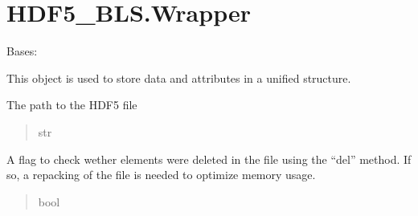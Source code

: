 \documentclass[letterpaper,10pt,english]{sphinxmanual}
\begin{document}
\sphinxstepscope


\section{HDF5\_BLS.Wrapper}
\label{\detokenize{source/_autosummary/HDF5_BLS.Wrapper:hdf5-bls-wrapper}}\label{\detokenize{source/_autosummary/HDF5_BLS.Wrapper::doc}}

\begin{fulllineitems}
\label{\detokenize{source/_autosummary/HDF5_BLS.Wrapper:HDF5_BLS.Wrapper}}
\pysigstartsignatures
\pysiglinewithargsret
{}
{}
{}
\pysigstopsignatures
\sphinxAtStartPar
Bases: 

\sphinxAtStartPar
This object is used to store data and attributes in a unified structure.

\begin{fulllineitems}
\label{\detokenize{source/_autosummary/HDF5_BLS.Wrapper:HDF5_BLS.Wrapper.filepath}}
\pysigstartsignatures
\pysigline
{}
\pysigstopsignatures
\sphinxAtStartPar
The path to the HDF5 file
\begin{quote}\begin{description}
\sphinxAtStartPar
str

\end{description}\end{quote}

\end{fulllineitems}


\begin{fulllineitems}
\label{\detokenize{source/_autosummary/HDF5_BLS.Wrapper:HDF5_BLS.Wrapper.need_for_repack}}
\pysigstartsignatures
\pysigline
{}
\pysigstopsignatures
\sphinxAtStartPar
A flag to check wether elements were deleted in the file using the “del” method. If so, a repacking of the file is needed to optimize memory usage.
\begin{quote}\begin{description}
\sphinxAtStartPar
bool


\end{description}
\end{quote}
\end{fulllineitems}
\end{fulllineitems}
\end{document}
